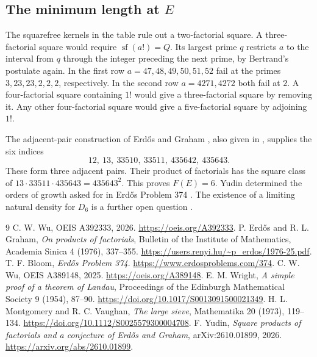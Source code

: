 \documentclass[10pt,letterpaper]{article}
\newcommand{\K}{\operatorname{sf}}
\begin{document}
\subsection{The minimum length at \(E\)}

The squarefree kernels in the table rule out a two-factorial square. A three-factorial square would require \(\K(a!)=Q\). Its largest prime \(q\) restricts \(a\) to the interval from \(q\) through the integer preceding the next prime, by Bertrand's postulate again. In the first row \(a=47,48,49,50,51,52\) fail at the primes \(3,23,23,2,2,2\), respectively. In the second row \(a=4271,4272\) both fail at \(2\). A four-factorial square containing \(1!\) would give a three-factorial square by removing it. Any other four-factorial square would give a five-factorial square by adjoining \(1!\).

The adjacent-pair construction of Erd\H{o}s and Graham \cite{eg}, also given in \cite[Eq.~(1.3)]{yudin}, supplies the six indices
\[
 12,\ 13,\ 33510,\ 33511,\ 435642,\ 435643.
\]
These form three adjacent pairs. Their product of factorials has the square class of
\(13\cdot33511\cdot435643=435643^2\). This proves \(F(E)=6\). Yudin determined the orders of growth asked for in Erd\H{o}s Problem 374 \cite{bloom,yudin}. The existence of a limiting natural density for \(D_6\) is a further open question \cite[Sec.~8]{yudin}.

\begin{thebibliography}{9}
 C. W. Wu, OEIS A392333, 2026. \url{https://oeis.org/A392333}.
 P. Erd\H{o}s and R. L. Graham, \emph{On products of factorials}, Bulletin of the Institute of Mathematics, Academia Sinica 4 (1976), 337--355. \url{https://users.renyi.hu/~p_erdos/1976-25.pdf}.
 T. F. Bloom, \emph{Erd\H{o}s Problem 374}. \url{https://www.erdosproblems.com/374}.
 C. W. Wu, OEIS A389148, 2025. \url{https://oeis.org/A389148}.
 E. M. Wright, \emph{A simple proof of a theorem of Landau}, Proceedings of the Edinburgh Mathematical Society 9 (1954), 87--90. \url{https://doi.org/10.1017/S0013091500021349}.
 H. L. Montgomery and R. C. Vaughan, \emph{The large sieve}, Mathematika 20 (1973), 119--134. \url{https://doi.org/10.1112/S0025579300004708}.
 F. Yudin, \emph{Square products of factorials and a conjecture of Erd\H{o}s and Graham}, arXiv:2610.01899, 2026. \url{https://arxiv.org/abs/2610.01899}.
\end{thebibliography}
\end{document}
